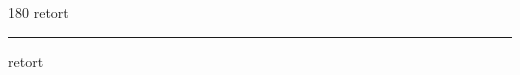 
\begin{frame}
\begin{center}
\begin{turn}{180}
{\fontsize{2.5cm}{1em}\selectfont retort}
\end{turn}
\vspace{1em}\par  
\hrule
\vspace{1em}\par  
{\fontsize{2.5cm}{1em}\selectfont retort}
\end{center}
\end{frame}
